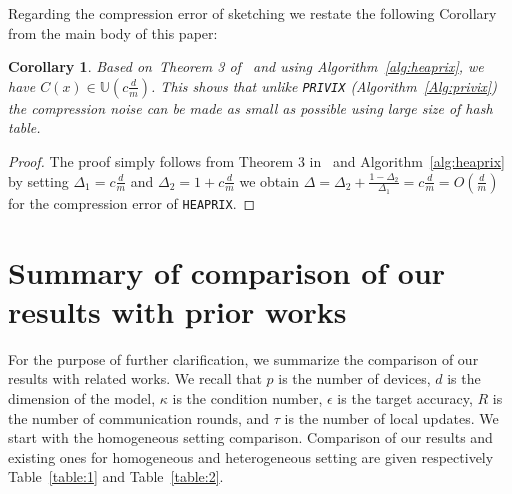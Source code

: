 \documentclass[11pt]{article}
\newtheorem{corollary}{Corollary}
\begin{document}
Regarding the compression error of sketching we restate the following Corollary from the main body of this paper:
\begin{corollary}
Based on~Theorem 3 of~\citep{horvath2020better} and using Algorithm~\ref{alg:heaprix}, we have $C(x)\in \mathbb{U}(c \frac{d}{m})$. This shows that unlike \texttt{PRIVIX} (Algorithm~\ref{Alg:privix}) the compression noise can be made as small as possible using large size of hash table.
\end{corollary}

\begin{proof}
The proof simply follows from Theorem 3 in~\cite{horvath2020better} and Algorithm~\ref{alg:heaprix} by setting $\Delta_1=c\frac{d}{m}$ and $\Delta_2=1+c\frac{d}{m}$ we obtain $\Delta=\Delta_2+\frac{1-\Delta_2}{\Delta_1}=c\frac{d}{m}=O\left(\frac{d}{m}\right)$ for the compression error of \texttt{HEAPRIX}. 
\end{proof}

\clearpage

\section{Summary of comparison of our results with prior works}\label{app:comparison}
For the purpose of further clarification, we summarize the comparison of our results with related works. 
We recall that $p$ is the number of devices, $d$ is the dimension of the model, $\kappa$ is the condition number, $\epsilon$ is the target accuracy, $R$ is  the number of communication rounds, and $\tau$ is the number of local updates. 
We start with the homogeneous setting comparison.
Comparison of our results and existing ones for homogeneous and heterogeneous setting are given respectively Table~\ref{table:1} and Table~\ref{table:2}.
\end{document}
